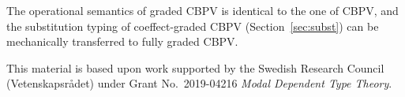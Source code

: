 \documentclass[acmsmall,review,anonymous]{acmart}\settopmatter{printfolios=true,printccs=false,printacmref=false}
\begin{document}

The operational semantics of graded CBPV is identical to the one of
CBPV, and the substitution typing of coeffect-graded CBPV
(Section~\ref{sec:subst}) can be mechanically transferred to fully
graded CBPV.

\begin{acks}                            %

  This material is based upon work supported by the
  Swedish Research Council (Vetenskapsrådet)
  under Grant
  No.~2019-04216 \emph{Modal Dependent Type Theory}.

\end{acks}






\end{document}

